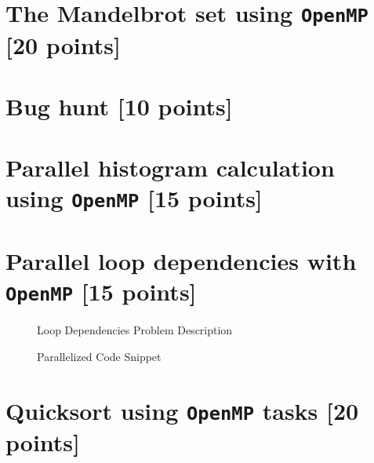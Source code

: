 \documentclass[unicode,11pt,a4paper,oneside,numbers=endperiod,openany]{scrartcl}
\begin{document}
\section{The Mandelbrot set  using \texttt{OpenMP} [20 points]}

\section{Bug hunt [10 points]}

\section{Parallel histogram calculation using \texttt{OpenMP} [15 points]}

\section{Parallel loop dependencies with \texttt{OpenMP} [15 points]}

\begin{figure}[H]
  \centering
  {\fontsize{8}{10}\selectfont
  }
  \caption{Loop Dependencies Problem Description}
  \label{fig:slurm_euler_2}
\end{figure}

\begin{figure}[H]
  \centering
  {\fontsize{8}{10}\selectfont
  }
  \caption{Parallelized Code Snippet}
  \label{fig:slurm_euler_2}
\end{figure}

\section{Quicksort using \texttt{OpenMP} tasks [20 points]}
\end{document}
